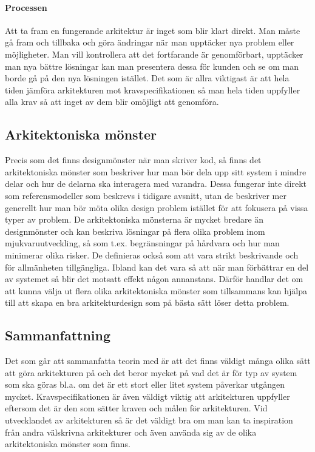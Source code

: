 \paragraph{Processen}
Att ta fram en fungerande arkitektur är inget som blir klart direkt. Man måste gå fram och tillbaka och göra ändringar när man upptäcker nya problem eller möjligheter. Man vill kontrollera att det fortfarande är genomförbart, upptäcker man nya bättre lösningar kan man presentera dessa för kunden och se om man borde gå på den nya lösningen istället. Det som är allra viktigast är att hela tiden jämföra arkitekturen mot kravspecifikationen så man hela tiden uppfyller alla krav så att inget av dem blir omöjligt att genomföra. %

\subsection{Arkitektoniska mönster}
Precis som det finns designmönster när man skriver kod, så finns det arkitektoniska mönster som beskriver hur man bör dela upp sitt system i mindre delar och hur de delarna ska interagera med varandra. Dessa fungerar inte direkt som referensmodeller som beskrevs i tidigare avsnitt, utan de beskriver mer generellt hur man bör möta olika design problem istället för att fokusera på vissa typer av problem.
\newline
\newline
De arkitektoniska mönsterna är mycket bredare än designmönster och kan beskriva lösningar på flera olika problem inom mjukvaruutveckling, så som t.ex. begränsningar på hårdvara och hur man minimerar olika risker. De definieras också som att vara strikt beskrivande och för allmänheten tillgängliga. \citep{Wiki}
\newline
\newline
Ibland kan det vara så att när man förbättrar en del av systemet så blir det motsatt effekt någon annanstans. Därför handlar det om att kunna välja ut flera olika arkitektoniska mönster som tillsammans kan hjälpa till att skapa en bra arkitekturdesign som på bästa sätt löser detta problem.

\subsection{Sammanfattning}
Det som går att sammanfatta teorin med är att det finns väldigt många olika sätt att göra arkitekturen på och det beror mycket på vad det är för typ av system som ska göras bl.a. om det är ett stort eller litet system påverkar utgången mycket. Kravspecifikationen är även väldigt viktig att arkitekturen uppfyller eftersom det är den som sätter kraven och målen för arkitekturen.
\newline
\newline
Vid utvecklandet av arkitekturen så är det väldigt bra om man kan ta inspiration från andra välskrivna arkitekturer och även använda sig av de olika arkitektoniska mönster som finns.
